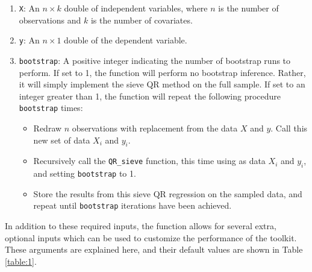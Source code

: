 \documentclass[12pt]{article}
\begin{document}
\begin{enumerate}
    \item \lstinline{X}: An $n\times k$ double of independent variables, where $n$ is the number of observations and $k$ is the number of covariates.
    \item \lstinline{y}: An $n \times 1$ double of the dependent variable.
    \item \lstinline{bootstrap}: A positive integer indicating the number of bootstrap runs to perform. If set to 1, the function will perform no bootstrap inference. Rather, it will simply implement the sieve QR method on the full sample. If set to an integer greater than 1, the function will repeat the following procedure \lstinline{bootstrap} times:
    \begin{itemize}
        \item Redraw $n$ observations with replacement from the data $X$ and $y$. Call this new set of data $X_i$ and $y_i$.
        \item Recursively call the \lstinline{QR_sieve} function, this time using as data $X_i$ and $y_i$, and setting \lstinline{bootstrap} to 1.
        \item Store the results from this sieve QR regression on the sampled data, and repeat until \lstinline{bootstrap} iterations have been achieved.
    \end{itemize}
\end{enumerate}

In addition to these required inputs, the function allows for several extra, optional inputs which can be used to customize the performance of the toolkit. These arguments are explained here, and their default values are shown in Table \ref{table:1}.
\end{document}
